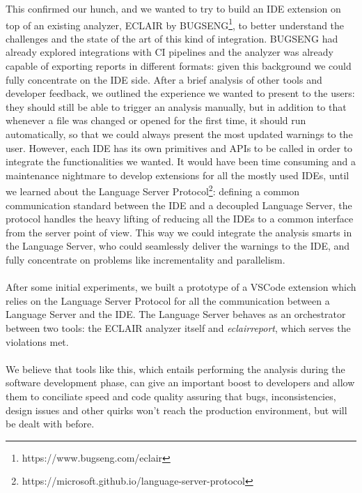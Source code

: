 This confirmed our hunch, and we wanted to try to build an IDE extension on top of an existing analyzer, ECLAIR by BUGSENG\footnote{https://www.bugseng.com/eclair}, to better understand the challenges and the state of the art of this kind of integration.
BUGSENG had already explored integrations with CI pipelines and the analyzer was already capable of exporting reports in different formats: given this background we could fully concentrate on the IDE side.
After a brief analysis of other tools and developer feedback, we outlined the experience we wanted to present to the users: they should still be able to trigger an analysis manually, but in addition to that whenever a file was changed or opened for the first time, it should run automatically, so that we could always present the most updated warnings to the user.
However, each IDE has its own primitives and APIs to be called in order to integrate the functionalities we wanted. 
It would have been time consuming and a maintenance nightmare to develop extensions for all the mostly used IDEs, until we learned about the Language Server Protocol\footnote{https://microsoft.github.io/language-server-protocol}: defining a common communication standard between the IDE and a decoupled Language Server, the protocol handles the heavy lifting of reducing all the IDEs to a common interface from the server point of view.
This way we could integrate the analysis smarts in the Language Server, who could seamlessly deliver the warnings to the IDE, and fully concentrate on problems like incrementality and parallelism.
\\\\
After some initial experiments, we built a prototype of a VSCode extension which relies on the Language Server Protocol for all the communication between a Language Server and the IDE. The Language Server behaves as an orchestrator between two tools: the ECLAIR analyzer itself and \emph{eclair\textunderscore	report}, which serves the violations met.
\\\\
We believe that tools like this, which entails performing the analysis during the software development phase, can give an important boost to developers and allow them to conciliate speed and code quality assuring that bugs, inconsistencies, design issues and other quirks won't reach the production environment, but will be dealt with before.
